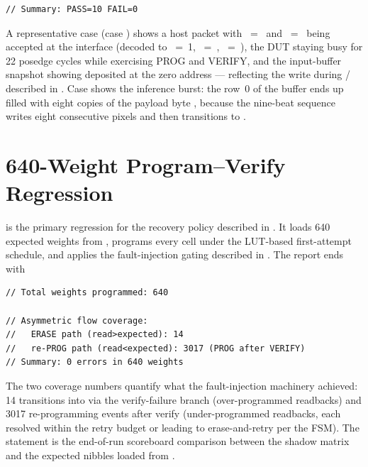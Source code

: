 \begin{lstlisting}[style=plainstyle,language={}]
// Summary: PASS=10 FAIL=0
\end{lstlisting}

A representative case (case ) shows a host packet with
~=~ and ~=~
being accepted at the interface (decoded to
~=~1, ~=~,
~=~), the DUT staying busy for 22 posedge
cycles while exercising PROG and VERIFY, and the input-buffer snapshot
showing  deposited at the zero address ---
reflecting the  write during /
described in . Case  shows
the inference burst: the row~0 of the buffer ends up filled with eight
copies of the payload byte , because the nine-beat
 sequence writes eight consecutive pixels and then
transitions to .

\section{640-Weight Program--Verify Regression}
\label{sec:results-640}

 is the primary regression for
the recovery policy described in .
It loads 640 expected weights from
, programs
every cell under the LUT-based first-attempt schedule, and applies the
fault-injection gating described in . The
report  ends with

\begin{lstlisting}[style=plainstyle,language={}]
// Total weights programmed: 640

// Asymmetric flow coverage:
//   ERASE path (read>expected): 14
//   re-PROG path (read<expected): 3017 (PROG after VERIFY)
// Summary: 0 errors in 640 weights
\end{lstlisting}

The two coverage numbers quantify what the fault-injection machinery
achieved: 14 transitions into  via the verify-failure
branch (over-programmed readbacks) and 3017 re-programming events after
verify (under-programmed readbacks, each resolved within the retry
budget or leading to erase-and-retry per the FSM). The
 statement is the end-of-run scoreboard
comparison between the shadow matrix and the expected nibbles loaded
from .

